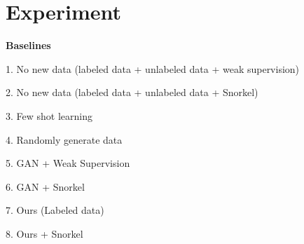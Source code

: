 \section{Experiment} 
\label{sec:exp}


{\bf Baselines}

1. No new data (labeled data + unlabeled data + weak supervision)

2. No new data (labeled data + unlabeled data + Snorkel)

3. Few shot learning

4. Randomly generate data

5. GAN + Weak Supervision

6. GAN + Snorkel

7. Ours (Labeled data)

8. Ours + Snorkel
